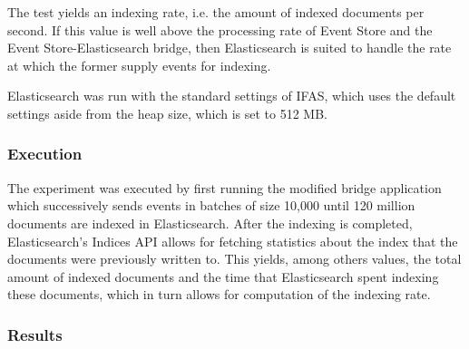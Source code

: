 The test yields an indexing rate, i.e. the amount of indexed documents per second.
If this value is well above the processing rate of Event Store and the Event Store-Elasticsearch bridge, then Elasticsearch is suited to handle the rate at which the former supply events for indexing.

Elasticsearch was run with the standard settings of \ac{IFAS}, which uses the default settings aside from the heap size, which is set to 512 MB.



\subsubsection{Execution}

The experiment was executed by first running the modified bridge application which successively sends events in batches of size 10,000 until 120 million documents are indexed in Elasticsearch.
After the indexing is completed, Elasticsearch's Indices API allows for fetching statistics about the index that the documents were previously written to.
This yields, among others values, the total amount of indexed documents and the time that Elasticsearch spent indexing these documents, which in turn allows for computation of the indexing rate.

\subsubsection{Results}

